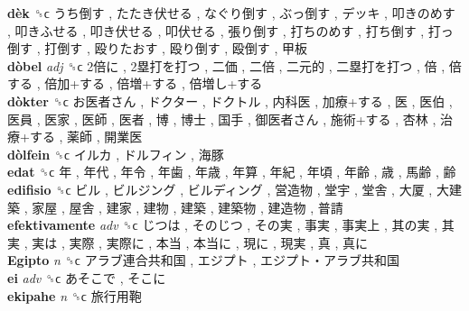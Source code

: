 \textbf{dèk} ␝ϲ   うち倒す ,  たたき伏せる ,  なぐり倒す ,  ぶっ倒す ,  デッキ ,  叩きのめす ,  叩きふせる ,  叩き伏せる ,  叩伏せる ,  張り倒す ,  打ちのめす ,  打ち倒す ,  打っ倒す ,  打倒す ,  殴りたおす ,  殴り倒す ,  殴倒す ,  甲板   \\
\textbf{dòbel} \emph{adj}  ␝ϲ   2倍に ,  2塁打を打つ ,  二価 ,  二倍 ,  二元的 ,  二塁打を打つ ,  倍 ,  倍する ,  倍加+する ,  倍増+する ,  倍増し+する   \\
\textbf{dòkter} ␝ϲ   お医者さん ,  ドクター ,  ドクトル ,  内科医 ,  加療+する ,  医 ,  医伯 ,  医員 ,  医家 ,  医師 ,  医者 ,  博 ,  博士 ,  国手 ,  御医者さん ,  施術+する ,  杏林 ,  治療+する ,  薬師 ,  開業医   \\
\textbf{dòlfein} ␝ϲ   イルカ ,  ドルフィン ,  海豚   \\
\textbf{edat} ␝ϲ   年 ,  年代 ,  年令 ,  年歯 ,  年歳 ,  年算 ,  年紀 ,  年頃 ,  年齢 ,  歳 ,  馬齢 ,  齢   \\
\textbf{edifisio} ␝ϲ   ビル ,  ビルジング ,  ビルディング ,  営造物 ,  堂宇 ,  堂舎 ,  大厦 ,  大建築 ,  家屋 ,  屋舎 ,  建家 ,  建物 ,  建築 ,  建築物 ,  建造物 ,  普請   \\
\textbf{efektivamente} \emph{adv}  ␝ϲ   じつは ,  そのじつ ,  その実 ,  事実 ,  事実上 ,  其の実 ,  其実 ,  実は ,  実際 ,  実際に ,  本当 ,  本当に ,  現に ,  現実 ,  真 ,  真に   \\
\textbf{Egipto} \emph{n}  ␝ϲ   アラブ連合共和国 ,  エジプト ,  エジプト・アラブ共和国   \\
\textbf{ei} \emph{adv}  ␝ϲ   あそこで ,  そこに   \\
\textbf{ekipahe} \emph{n}  ␝ϲ   旅行用鞄   \\
